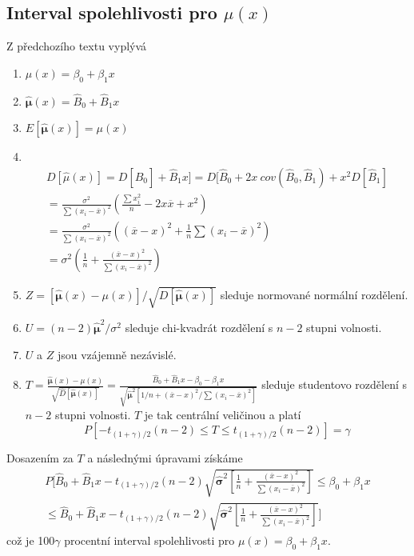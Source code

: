 \subsection {Interval spolehlivosti pro $\mu(x)$}

Z předchozího textu vyplývá
\begin{enumerate}
\item $\mu(x) = \beta_0 + \beta_1 x$
\item $\hat{\boldsymbol \mu}(x) = \hat{B}_0 + \hat{B}_1 x$
\item $E[\hat{\boldsymbol \mu}(x)] = \mu(x)$
\item ~
\begin{multline*}
D[\hat{\mu}(x)] = D[\hat{B}_0] + \hat{B}_1 x] = D[\hat{B}_0 + 2x~cov(\hat{B}_0, \hat{B}_1) + x^2 D[\hat{B}_1]\\
= \frac{\sigma^2}{\sum (x_i - \overline{x})^2}\left(\frac{\sum x_i^2}{n} - 2 x \overline{x} + x^2 \right)\\
= \frac{\sigma^2}{\sum (x_i - \overline{x})^2}\left((\overline{x} - x)^2 + \frac{1}{n}\sum (x_i - \overline{x})^2 \right)\\
= \sigma^2 \left(\frac{1}{n} + \frac{(\overline{x} - x)^2}{\sum (x_i - \overline{x})^2}\right)
\end{multline*}
\item $Z = [\hat{\boldsymbol \mu}(x) - \mu(x)]/\sqrt{D[\hat{\boldsymbol \mu}(x)]}$ sleduje normované normální rozdělení.
\item $U = (n - 2)\hat{\boldsymbol \mu}^2/ \sigma^2$ sleduje chi-kvadrát rozdělení s $n - 2$ stupni volnosti.
\item $U$ a $Z$ jsou vzájemně nezávislé.
\item $T = \frac{\hat{\boldsymbol \mu}(x) - \mu(x)}{\sqrt{\hat{D}[\hat{\boldsymbol \mu}(x)]}} = \frac{\hat{B}_0 + \hat{B}_1x - \beta_0 - \beta_1x}{\sqrt{\hat{\boldsymbol \mu}^2[1/n + (\overline{x} - x)^2 / \sum (x_i - \overline{x})^2]}}$ sleduje studentovo rozdělení s $n - 2$ stupni volnosti. $T$ je tak centrální veličinou a platí
\begin{equation*}
P[-t_{(1 + \gamma)/2}(n - 2) \le T \le t_{(1 + \gamma)/2}(n - 2)] = \gamma
\end{equation*}
\end{enumerate}
Dosazením za $T$ a následnými úpravami získáme
\begin{multline*}
P\Bigg[\hat{B}_0 + \hat{B}_1x - t_{(1 + \gamma)/2}(n - 2)\sqrt{\hat{\boldsymbol \sigma}^2 \left[\frac{1}{n} + \frac{(\overline{x} - x)^2}{\sum (x_i - \overline{x})^2}\right]} \le \beta_0 + \beta_1 x\\
\le \hat{B}_0 + \hat{B}_1x - t_{(1 + \gamma)/2}(n - 2)\sqrt{\hat{\boldsymbol \sigma}^2 \left[\frac{1}{n} + \frac{(\overline{x} - x)^2}{\sum (x_i - \overline{x})^2}\right]}\Bigg]
\end{multline*}
což je 100$\gamma$ procentní interval spolehlivosti pro $\mu(x) = \beta_0 + \beta_1x$.


